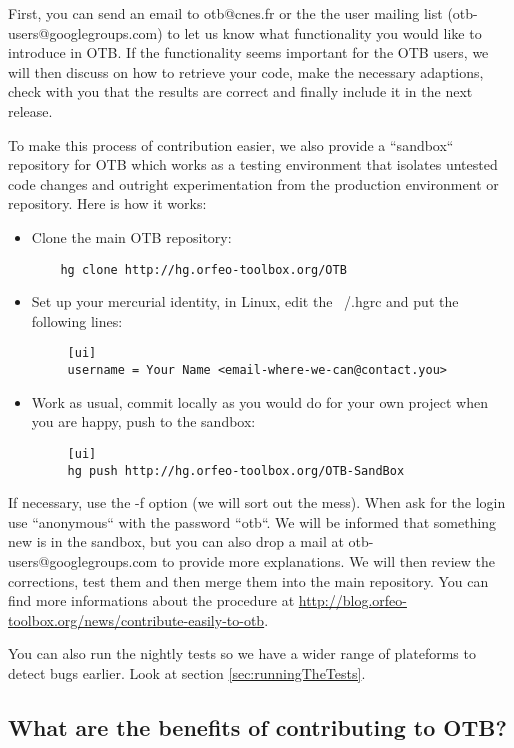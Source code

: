 First, you can send an email to otb@cnes.fr or the the user mailing list (otb-users@googlegroups.com) 
to let us know what functionality
you would like to introduce in OTB. If the functionality seems important for the
OTB users, we will then discuss on how to retrieve your code,
make the necessary adaptions, check with you that the results are correct and finally
include it in the next release.

To make this process of contribution easier, we also provide a 
``sandbox`` repository for OTB which works as a testing environment that
isolates untested code changes and outright experimentation from the
production environment or repository. Here is how it works:

\begin{itemize}
  \item Clone the main OTB repository: 
    \begin{verbatim}
    hg clone http://hg.orfeo-toolbox.org/OTB
    \end{verbatim}
  \item Set up your mercurial identity, in Linux, edit the ~/.hgrc and put the following lines:
    \begin{verbatim}
     [ui]
     username = Your Name <email-where-we-can@contact.you>
    \end{verbatim}
  \item Work as usual, commit locally as you would do for your own project
    when you are happy, push to the sandbox:
    \begin{verbatim}
     [ui]
     hg push http://hg.orfeo-toolbox.org/OTB-SandBox
    \end{verbatim}
\end{itemize}  

If necessary, use the -f option (we will sort out the mess). When ask
for the login use ``anonymous`` with the password ``otb``.  We will be
informed that something new is in the sandbox, but you can also drop a
mail at otb-users@googlegroups.com to provide more explanations.
We will then review the corrections, test them and then merge them
into the main repository.  You can find more informations about the
procedure at
\url{http://blog.orfeo-toolbox.org/news/contribute-easily-to-otb}.      

You can also run the nightly tests so we have a wider range of plateforms to detect
bugs earlier. Look at section \ref{sec:runningTheTests}.

\subsection{What are the benefits of contributing to OTB?}

